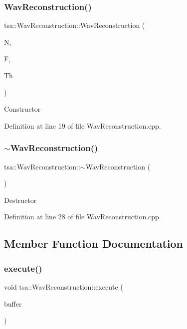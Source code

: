 \subsubsection{\texorpdfstring{Wav\+Reconstruction()}{WavReconstruction()}}
{\footnotesize\ttfamily tsa\+::\+Wav\+Reconstruction\+::\+Wav\+Reconstruction (\begin{DoxyParamCaption}\item[{unsigned int}]{N,  }\item[{enum \hyperlink{classtsa_1_1_wavelet_transform_a5a529de70e0004333fcf23b9cca88ce7}{Wavelet\+Transform\+::\+Wavelet\+Type}}]{F,  }\item[{double}]{Th }\end{DoxyParamCaption})}

Constructor 

Definition at line 19 of file Wav\+Reconstruction.\+cpp.

\mbox{\label{classtsa_1_1_wav_reconstruction_a98992576615196547b63822980a1c9d3}} 
\subsubsection{\texorpdfstring{$\sim$\+Wav\+Reconstruction()}{~WavReconstruction()}}
{\footnotesize\ttfamily tsa\+::\+Wav\+Reconstruction\+::$\sim$\+Wav\+Reconstruction (\begin{DoxyParamCaption}{ }\end{DoxyParamCaption})}

Destructor 

Definition at line 28 of file Wav\+Reconstruction.\+cpp.



\subsection{Member Function Documentation}
\mbox{\label{classtsa_1_1_wav_reconstruction_abf80b87f146d0557af51f4e5ec60580e}} 
\subsubsection{\texorpdfstring{execute()}{execute()}}
{\footnotesize\ttfamily void tsa\+::\+Wav\+Reconstruction\+::execute (\begin{DoxyParamCaption}\item[{\hyperlink{namespacetsa_ad260cd21c1891c4ed391fe788569aba4}{Dmatrix} \&}]{buffer }\end{DoxyParamCaption})}



